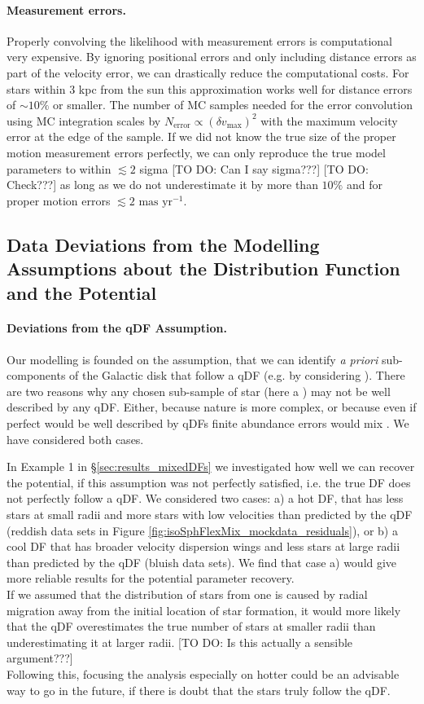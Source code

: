\paragraph{Measurement errors.} Properly convolving the likelihood with measurement errors is computational very expensive. By ignoring positional errors and only including distance errors as part of the velocity error, we can drastically reduce the computational costs. For stars within 3 kpc from the sun this approximation works well for distance errors of $\sim 10\%$ or smaller. The number of MC samples needed for the error convolution using MC integration scales by $N_\text{error} \propto (\delta v_\text{max})^2$ with the maximum velocity error at the edge of the sample. If we did not know the true size of the proper motion measurement errors perfectly, we can only reproduce the true model parameters to within $\lesssim 2$ sigma [TO DO: Can I say sigma???] [TO DO: Check???] as long as we do not underestimate it by more than $10\%$ and for proper motion errors $\lesssim 2 \text{ mas yr}^{-1}$.

\subsection{Data Deviations from the Modelling Assumptions about the Distribution Function and the Potential}

\paragraph{Deviations from the qDF Assumption.}  Our modelling is founded on the assumption, that we can identify {\sl a priori} sub-components of the Galactic disk that follow a qDF (e.g. by considering \MAPs ). There are two reasons why any chosen sub-sample of star (here a \MAP ) may not be well described by any qDF. Either, because nature is more complex, or because even if perfect
\MAPs would be well described by qDFs finite abundance errors would mix \MAPs .  We have considered both cases.

 In Example 1 in \S\ref{sec:results_mixedDFs} we investigated how well we can recover the potential, if this assumption was not perfectly satisfied, i.e. the \MAPs true DF does not perfectly follow a qDF. We considered two cases: a) a hot DF, that has less stars at small radii and more stars with low velocities than predicted by the qDF (reddish data sets in Figure \ref{fig:isoSphFlexMix_mockdata_residuals}), or b) a cool DF that has broader velocity dispersion wings and less stars at large radii than predicted by the qDF (bluish data sets). We find that case a) would give more reliable results for the potential parameter recovery.
\\If we assumed that the distribution of stars from one \MAP is caused by radial migration away from the initial location of star formation, it would more likely that the qDF overestimates the true number of stars at smaller radii than underestimating it at larger radii. [TO DO: Is this actually a sensible argument???]
\\Following this, focusing the analysis especially on hotter \MAPs could be an advisable way to go in the future, if there is doubt that the stars truly follow the qDF.

